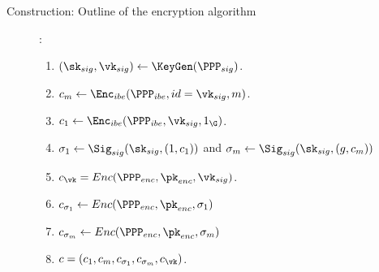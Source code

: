 \begin{frame}{Construction: Outline of the encryption algorithm}
  \begin{description}
  \item[]:
    \begin{enumerate}      
    \item $(\sk_{sig}, \vk_{sig}) \gets \KeyGen(\PPP_{sig})$.
    \item $ c_m \gets \Enc_{ibe}(\PPP_{ibe}, id = \vk_{sig}, m)$.
    \item $c_1 \gets \Enc_{ibe}(\PPP_{ibe}, \vk_{sig}, 1_\G)$. 
    \item $\sigma_1 \gets \Sig_{sig}(\sk_{sig}, (1,c_1))$ and $\sigma_m \gets \Sig_{sig}(\sk_{sig}, (g,c_m))$ 
    \item $c_{\vk} = Enc(\PPP_{enc}, \pk_{enc}, \vk_{sig})$.
    \item $c_{\sigma_1} \gets Enc(\PPP_{enc}, \pk_{enc}, \sigma_1)$
    \item $c_{\sigma_m} \gets Enc(\PPP_{enc}, \pk_{enc}, \sigma_m)$
    \item $c = (c_1, c_m, c_{\sigma_1}, c_{\sigma_m}, c_{\vk})$.
    \end{enumerate}
  \end{description}
  
\end{frame}

